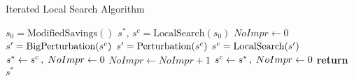 \begin{algorithm}[ht]
    \caption{Iterated Local Search Algorithm}\label{alg:principal_ILS}
    \begin{algorithmic}[1]
        \State $s_0 = \text{ModifiedSavings}()$ 
        \State $s^*,\,s^c = \text{LocalSearch}(s_0)$
        \State $NoImpr \leftarrow 0$
        \State $s\sp{\prime} = \text{BigPerturbation}(s^c)$ 
        \Else
        \State $s\sp{\prime}  = \text{Perturbation}(s^c)$ 
        \EndIf
        \State $s\sp{c} = \text{LocalSearch}(s\sp{\prime})$
        \State{}
         
        \State $s^* \gets s\sp{c}\,,\;NoImpr \gets 0$
        \Else
        \State $NoImpr \gets NoImpr + 1$
        \State $s^c \gets s\sp{*}\,,\;NoImpr \gets 0$ 
        \EndIf
        \EndIf
        \EndWhile
        \State \textbf{return} $s^*$
        \EndProcedure
    \end{algorithmic}
\end{algorithm}
